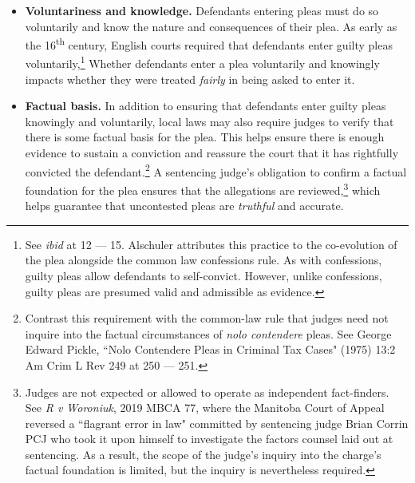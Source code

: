 \begin{itemize}
\item \textbf{Voluntariness and knowledge.} Defendants entering pleas must do so voluntarily and know the nature and consequences of their plea. As early as the 16\textsuperscript{th} century, English courts required that defendants enter guilty pleas voluntarily,\footnote{See \textit{ibid} at 12 — 15. Alschuler attributes this practice to the co-evolution of the plea alongside the common law confessions rule. As with confessions, guilty pleas allow defendants to self-convict. However, unlike confessions, guilty pleas are presumed valid and admissible as evidence.} Whether defendants enter a plea voluntarily and knowingly impacts whether they were treated \textit{fairly} in being asked to enter it.
\item \textbf{Factual basis.} In addition to ensuring that defendants enter guilty pleas knowingly and voluntarily, local laws may also require judges to verify that there is some factual basis for the plea. This helps ensure there is enough evidence to sustain a conviction and reassure the court that it has rightfully convicted the defendant.\footnote{Contrast this requirement with the common-law rule that judges need not inquire into the factual circumstances of \textit{nolo contendere} pleas. See George Edward Pickle, ``Nolo Contendere Pleas in Criminal Tax Cases" (1975) 13:2 Am Crim L Rev 249 at 250 — 251.} A sentencing judge's obligation to confirm a factual foundation for the plea ensures that the allegations are reviewed,\footnote{Judges are not expected or allowed to operate as independent fact-finders. See \textit{R v Woroniuk}, 2019 MBCA 77, where the Manitoba Court of Appeal reversed a ``flagrant error in law" committed by sentencing judge Brian Corrin PCJ who took it upon himself to investigate the factors counsel laid out at sentencing. As a result, the scope of the judge's inquiry into the charge's factual foundation is limited, but the inquiry is nevertheless required.} which helps guarantee that uncontested pleas are \textit{truthful} and accurate.

\end{itemize}
